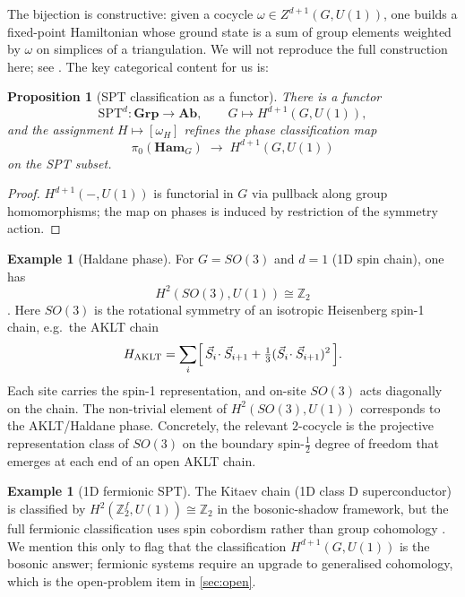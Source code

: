 \documentclass[12pt]{article}
\theoremstyle{plain}
\newtheorem{proposition}[theorem]{Proposition}
\theoremstyle{definition}
\newtheorem{example}[theorem]{Example}
\theoremstyle{remark}
\newcommand{\Ham}{\mathbf{Ham}}
\begin{document}
The bijection is constructive: given a cocycle $\omega\in Z^{d+1}(G,U(1))$, one builds a
fixed-point Hamiltonian whose ground state is a sum of group elements weighted by
$\omega$ on simplices of a triangulation. We will not reproduce the full construction
here; see \cite{ChenGuLiuWen2013}. The key categorical content for us is:

\begin{proposition}[SPT classification as a functor]
\label{prop:spt-functor}
There is a functor
\[
\mathrm{SPT}^{d}: \mathbf{Grp} \to \mathbf{Ab}, \qquad
G \mapsto H^{d+1}(G,U(1)),
\]
and the assignment $H\mapsto[\omega_{H}]$ refines the phase classification map
\[
\pi_{0}(\Ham_{G}) \;\to\; H^{d+1}(G,U(1))
\]
on the SPT subset.
\end{proposition}

\begin{proof}
$H^{d+1}(-,U(1))$ is functorial in $G$ via pullback along group homomorphisms; the map
on phases is induced by restriction of the symmetry action.
\end{proof}

\begin{example}[Haldane phase]
\label{ex:haldane}
For $G=SO(3)$ and $d=1$ (1D spin chain), one has
\[
H^{2}(SO(3),U(1))\cong\mathbb{Z}_{2}
\]
\cite{ChenGuLiuWen2013}. Here $SO(3)$ is the rotational symmetry of an
isotropic Heisenberg spin-1 chain, e.g.\ the AKLT chain
\begin{equation}
\label{eq:aklt}
H_{\mathrm{AKLT}}=\sum_{i}\Bigl[\,\vec{S}_{i}\!\cdot\vec{S}_{i+1}
+\tfrac{1}{3}(\vec{S}_{i}\!\cdot\vec{S}_{i+1})^{2}\,\Bigr].
\end{equation}
Each site carries the spin-1 representation, and on-site $SO(3)$ acts diagonally on the
chain. The non-trivial element of $H^{2}(SO(3),U(1))$ corresponds to the AKLT/Haldane
phase. Concretely, the relevant $2$-cocycle is the projective representation class of
$SO(3)$ on the boundary spin-$\tfrac{1}{2}$ degree of freedom that emerges at each end
of an open AKLT chain.
\end{example}

\begin{example}[1D fermionic SPT]
\label{ex:1d-fermionic}
The Kitaev chain (1D class D superconductor) is classified by
$H^{2}(\mathbb{Z}_{2}^{f},U(1))\cong\mathbb{Z}_{2}$ in the bosonic-shadow framework, but
the full fermionic classification uses spin cobordism rather than group cohomology
\cite{FreedHopkins2021}. We mention this only to flag that the classification
$H^{d+1}(G,U(1))$ is the bosonic answer; fermionic systems require an upgrade to
generalised cohomology, which is the open-problem item in \cref{sec:open}.
\end{example}
\end{document}
